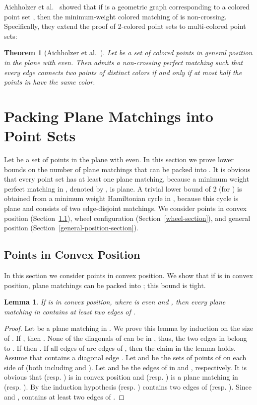 \documentclass[11pt,a4paper]{article}
\newcommand{\CH}[1]{\text{}}
\newtheorem{lemma}{Lemma}
\newtheorem{theorem}{Theorem}
\begin{document}
Aichholzer et al.~\cite{Aichholzer2010} showed that if  is a geometric graph corresponding to a colored point set , then the minimum-weight colored matching of  is non-crossing. Specifically, they extend the proof of 2-colored point sets to multi-colored point sets:

\begin{theorem}[Aichholzer et al.~\cite{Aichholzer2010}]
\label{Aichholzer}
Let  be a set of colored points in general position in the plane with  even. Then 
admits a non-crossing perfect matching such that every edge connects two points of distinct colors if and only if at most half the points in  have the same color.
\end{theorem}


\section{Packing Plane Matchings into Point Sets}
\label{edge-disjoint-plane-section}
Let  be a set of  points in the plane with  even. In this section we prove lower bounds on the number of plane matchings that can be packed into . It is obvious that every point set has at least one plane matching, because a minimum weight perfect matching in , denoted by , is plane. A trivial lower bound of 2 (for ) is obtained from a minimum weight Hamiltonian cycle in , because this cycle is plane and consists of two edge-disjoint matchings. We consider points in convex position (Section~\ref{convex-position-section}), wheel configuration (Section~\ref{wheel-section}), and general position (Section~\ref{general-position-section}). 


\subsection{Points in Convex Position}
\label{convex-position-section}
In this section we consider points in convex position. We show that if  is in convex position,  plane matchings can be packed into ; this bound is tight.
\begin{lemma}
\label{two-convex-edges}
 If  is in convex position, where  is even and , then every plane matching in  contains at least two edges of \CH{P}.
\end{lemma}
\begin{proof}
Let  be a plane matching in . We prove this lemma by induction on the size of . If , then . None of the diagonals of  can be in , thus, the two edges in  belong to \CH{P}. If  then . If all edges of  are edges of \CH{P}, then the claim in the lemma holds. Assume that  contains a diagonal edge . Let  and  be the sets of points of  on each side of  (both including  and ). Let  and  be the edges of  in  and , respectively. It is obvious that  (resp. ) is in convex position and  (resp. ) is a plane matching in  (resp. ). By the induction hypothesis  (resp. ) contains two edges of \CH{P_1} (resp. \CH{P_2}). Since  and ,  contains at least two edges of \CH{P}.
\end{proof}
\end{document}
